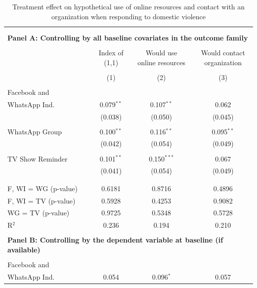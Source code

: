 \documentclass[12pt]{article}
\begin{document}
\begin{table}[H] \centering 
  \caption{Treatment effect on hypothetical use of online resources and contact with an organization when responding to domestic violence} 
  \label{} 
\footnotesize 
\begin{tabular}{@{\extracolsep{20pt}}lccc} 
\\[-1.8ex]\hline 
\hline \\[-1.8ex] 
\\[-0.5ex] 
\multicolumn{4}{l}{\textbf{Panel A: Controlling by all baseline covariates in the outcome family}} \\
\hline \\[-1ex]  
 & \shortstack{Index of \\ (1,1)} & \shortstack{Would use \\ online resources} & \shortstack{Would contact \\ organization} \\ 
\\[-1.8ex] & (1) & (2) & (3)\\ 
\hline \\[-1.8ex] 
 Facebook and \\ WhatsApp Ind. & 0.079$^{**}$ & 0.107$^{**}$ & 0.062 \\ 
  & (0.038) & (0.050) & (0.045) \\ 
  & & & \\ 
 WhatsApp Group & 0.100$^{**}$ & 0.116$^{**}$ & 0.095$^{**}$ \\ 
  & (0.042) & (0.054) & (0.049) \\ 
  & & & \\ 
 TV Show Reminder & 0.101$^{**}$ & 0.150$^{***}$ & 0.067 \\ 
  & (0.041) & (0.054) & (0.049) \\ 
  & & & \\ 
\hline \\[-1.8ex] 
F, WI = WG (p-value) & 0.6181 & 0.8716 & 0.4896 \\ 
F, WI = TV (p-value) & 0.5928 & 0.4253 & 0.9082 \\ 
WG = TV (p-value) & 0.9725 & 0.5348 & 0.5728 \\ 
R$^{2}$ & 0.236 & 0.194 & 0.210 \\ 
\hline 
\\[-0.5ex] 
\multicolumn{4}{l}{\textbf{Panel B: Controlling by the dependent variable at baseline (if available)}} \\
\hline \\[-1ex]  
 Facebook and \\ WhatsApp Ind. & 0.054 & 0.096$^{*}$ & 0.057 \\ 

\end{tabular}
\end{table}
\end{document}
